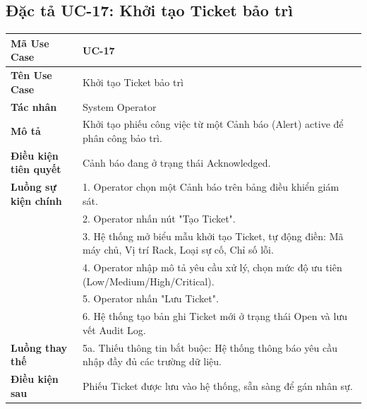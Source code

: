 \subsection{Đặc tả UC-17: Khởi tạo Ticket bảo trì}
\begin{table}[H]
\centering
\begin{tabular}{|p{4cm}|p{10.5cm}|}
\hline
\textbf{Mã Use Case} & \textbf{UC-17} \\ \hline
\textbf{Tên Use Case} & Khởi tạo Ticket bảo trì \\ \hline
\textbf{Tác nhân} & System Operator \\ \hline
\textbf{Mô tả} & Khởi tạo phiếu công việc từ một Cảnh báo (Alert) active để phân công bảo trì. \\ \hline
\textbf{Điều kiện tiên quyết} & Cảnh báo đang ở trạng thái Acknowledged. \\ \hline
\textbf{Luồng sự kiện chính} & 
1. Operator chọn một Cảnh báo trên bảng điều khiển giám sát.\\ 
& 2. Operator nhấn nút "Tạo Ticket".\\ 
& 3. Hệ thống mở biểu mẫu khởi tạo Ticket, tự động điền: Mã máy chủ, Vị trí Rack, Loại sự cố, Chỉ số lỗi.\\ 
& 4. Operator nhập mô tả yêu cầu xử lý, chọn mức độ ưu tiên (Low/Medium/High/Critical).\\ 
& 5. Operator nhấn "Lưu Ticket".\\ 
& 6. Hệ thống tạo bản ghi Ticket mới ở trạng thái Open và lưu vết Audit Log. \\ \hline
\textbf{Luồng thay thế} & 5a. Thiếu thông tin bắt buộc: Hệ thống thông báo yêu cầu nhập đầy đủ các trường dữ liệu. \\ \hline
\textbf{Điều kiện sau} & Phiếu Ticket được lưu vào hệ thống, sẵn sàng để gán nhân sự. \\ \hline
\end{tabular}
\end{table}

